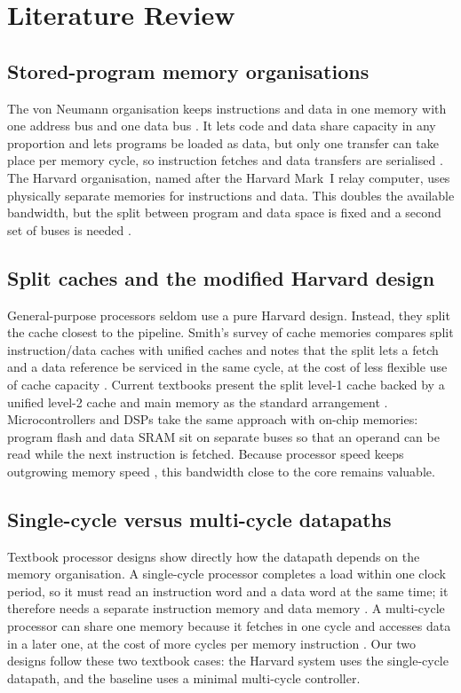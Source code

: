 \documentclass[conference]{IEEEtran}
\begin{document}
\section{Literature Review}
\subsection{Stored-program memory organisations}
The von Neumann organisation keeps instructions and data in one memory with one address bus and
one data bus \cite{vonneumann1945}. It lets code and data share capacity in any proportion and
lets programs be loaded as data, but only one transfer can take place per memory cycle, so
instruction fetches and data transfers are serialised \cite{backus1978}. The Harvard
organisation, named after the Harvard Mark~I relay computer, uses physically separate memories
for instructions and data. This doubles the available bandwidth, but the split between program
and data space is fixed and a second set of buses is needed \cite{hp_quant}.

\subsection{Split caches and the modified Harvard design}
General-purpose processors seldom use a pure Harvard design. Instead, they split the cache
closest to the pipeline. Smith's survey of cache memories compares split instruction/data caches
with unified caches and notes that the split lets a fetch and a data reference be serviced in
the same cycle, at the cost of less flexible use of cache capacity \cite{smith1982}. Current
textbooks present the split level-1 cache backed by a unified level-2 cache and main memory as
the standard arrangement \cite{hp_quant,ph_riscv}. Microcontrollers and DSPs take the same
approach with on-chip memories: program flash and data SRAM sit on separate buses so that an
operand can be read while the next instruction is fetched. Because processor speed keeps
outgrowing memory speed \cite{wulf1995}, this bandwidth close to the core remains valuable.

\subsection{Single-cycle versus multi-cycle datapaths}
Textbook processor designs show directly how the datapath depends on the memory organisation.
A single-cycle processor completes a load within one clock period, so it must read an
instruction word and a data word at the same time; it therefore needs a separate instruction
memory and data memory \cite{ph_riscv,harris_riscv}. A multi-cycle processor can share one
memory because it fetches in one cycle and accesses data in a later one, at the cost of more
cycles per memory instruction \cite{harris_riscv}. Our two designs follow these two textbook
cases: the Harvard system uses the single-cycle datapath, and the baseline uses a minimal
multi-cycle controller.
\end{document}
